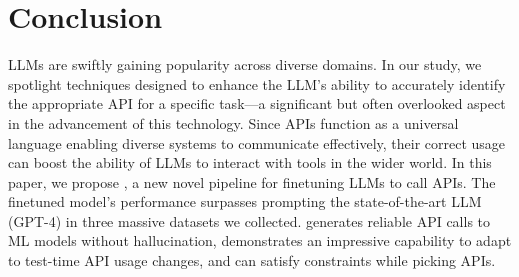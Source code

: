 \section{Conclusion}
\label{sec:conclusion}
LLMs are swiftly gaining popularity across diverse domains. In our study, we spotlight techniques designed to enhance the LLM's ability to accurately identify the appropriate API for a specific task—a significant but often overlooked aspect in the advancement of this technology. Since APIs function as a universal language enabling diverse systems to communicate effectively, their correct usage can boost the ability of LLMs to interact with tools in the wider world.
In this paper, we propose \oursmethod{}, a new novel pipeline for finetuning LLMs to call APIs. The finetuned model's performance surpasses prompting the state-of-the-art LLM (GPT-4) in three massive datasets we collected. \gorilla{} generates reliable API calls to ML models without hallucination, demonstrates an impressive capability to adapt to test-time API usage changes, and can satisfy constraints while picking APIs. 